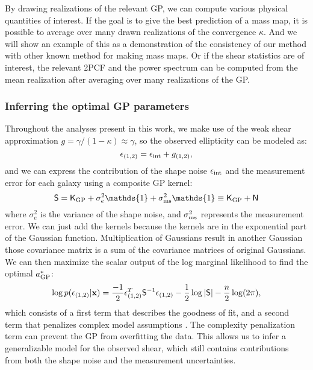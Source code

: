By drawing realizations of the relevant GP, we can compute various 
physical quantities of interest. If the goal is to give the best prediction of a
mass map, it is possible to average over many drawn realizations of the
convergence $\kappa$. And we will show an example of this as a demonstration of
the consistency of our method with other known method for making mass maps.
Or if the shear statistics are of interest, the relevant 2PCF and the power
spectrum can be computed from the mean realization 
after averaging over many realizations of the GP.

\subsubsection{Inferring the optimal GP parameters}
\label{subsubsection:optimize_GP_params}
Throughout the analyses present in this work, 
we make use of the weak shear approximation 
$g = \gamma / (1 - \kappa)  \approx \gamma$, so the observed ellipticity can be
modeled as: 
\begin{equation}
	\epsilon_{(1, 2)} = \epsilon_{\rm int} + g_{(1, 2)}, 
	\label{eq:weak_shear_approx}
\end{equation}
and we can express the contribution of the shape noise $\epsilon_{\rm int}$
and the measurement error
for each galaxy using a composite GP kernel:
\begin{equation}
	\mathsf{S} = \kerngp_{\rm GP} + \sigma_e^2 \mathds{1}  + \sigma_{\rm ms}^2
	\mathds{1}
	\equiv \kerngp_{\rm GP} + \mathsf{N}
	\label{eq:composite_kernel}
\end{equation}
where $\sigma_e^2$ is the variance of the shape noise, and $\sigma_{\rm ms}^2$
represents the measurement error. We can just add the kernels because the
kernels are in the exponential part of the Gaussian function.
Multiplication of Gaussians result in another Gaussian those covariance matrix
is a sum of the covariance matrices of original Gaussians. 
We can then maximize the scalar output of the log marginal likelihood to find the optimal 
$a_{\rm GP}^*$: 
\begin{equation}
	\log p(\epsilon_{(1,2)} | \mathbf{x}) = \frac{-1}{2}\epsilon_{(1,2)}^T \mathsf{S}^{-1}
\epsilon_{(1, 2)}
- \frac{1}{2}\log|\mathsf{S}| - \frac{n}{2}\log(2\pi),
\label{eq:log_marginal_likelihood}
\end{equation}
which consists of a first term that describes the goodness of fit,
and a second term that penalizes complex model assumptions \citep{Rasmussen2006}. 
The complexity penalization term can prevent the GP from overfitting the data.
This allows us to infer a generalizable model for the observed shear, which still
contains contributions from both the shape noise and the measurement
uncertainties. 

